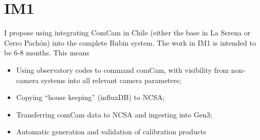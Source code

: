 \section{IM1}

I propose using integrating \gls{ComCam} in Chile (either the base in La Serena or Cerro Pach\'on)
into the complete Rubin system. The work in IM1 is
intended to be 6-8 months.
This means
\begin{itemize}
\item Using observatory codes to command comCam, with visibility from non-camera systems
  into all relevant camera parameters;
\item Copying ``house keeping'' (\eg influxDB) to NCSA;
\item Transferring comCam data to NCSA and ingesting into Gen3;
\item Automatic generation and validation of calibration products
\end{itemize}

